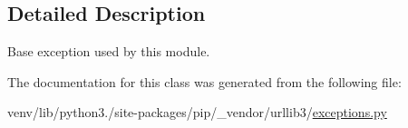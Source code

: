 \subsection{Detailed Description}
\begin{DoxyVerb}Base exception used by this module.\end{DoxyVerb}
 

The documentation for this class was generated from the following file\+:\begin{DoxyCompactItemize}
\item 
venv/lib/python3./site-\/packages/pip/\+\_\+vendor/urllib3/\hyperlink{pip_2__vendor_2urllib3_2exceptions_8py}{exceptions.\+py}\end{DoxyCompactItemize}
